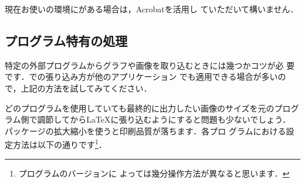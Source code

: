 現在お使いの環境にがある場合は，Acrobatを活用し
ていただいて構いません．

\subsection{プログラム特有の処理}

特定の外部プログラムからグラフや画像を取り込むときには幾つかコツが必
要です．での張り込み方が他のアプリケーション
でも適用できる場合が多いので，上記の方法を試してみてください．

どのプログラムを使用していても最終的に出力したい画像のサイズを元のプログ
ラム側で調節してから{\LaTeX}に張り込むようにすると問題も少ないでしょう．
パッケージの拡大縮小を使うと印刷品質が落ちます．各プロ
グラムにおける設定方法は以下の通りです\footnote{プログラムのバージョンに
よっては幾分操作方法が異なると思います．}．

